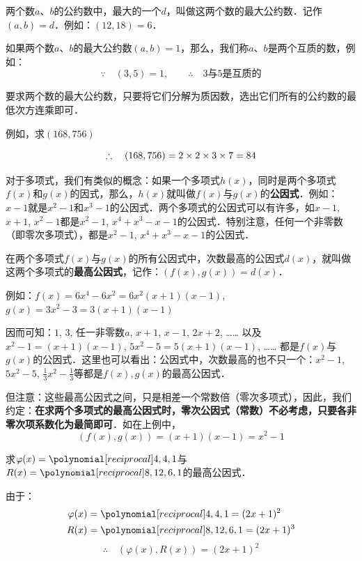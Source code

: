 两个数$a$、$b$的公约数中，最大的一个$d$，叫做这两个数的最大公约数．记作$(a,b)=d$．例如：$(12, 18)=6$．

如果两个数$a$、$b$的最大公约数$(a,b)=1$，那么，我们称$a$、$b$是两个互质的数，例如：
\[\because\quad (3,5)=1,\qquad \therefore\quad \text{3与5是互质的}\]

要求两个数的最大公约数，只要将它们分解为质因数，选出它们所有的公约数的最低次方连乘即可．

例如，求$(168,756)$
\begin{center}
\end{center}
\[\therefore \quad (168, 756)=2\times 2\times 3\times 7=84\]

对于多项式，我们有类似的概念：如果一个多项式$h(x)$，同时是两个多项式$f(x)$和$g(x)$的因式，那么，$h(x)$就叫做$f(x)$与$g(x)$的\textbf{公因式}．例如：$x-1$就是$x^2-1$和$x^3-1$的公因式．两个多项式的公因式可以有许多，如$x-1$, $x+1$, $x^2-1$都是$x^2-1$, $x^4+x^3-x-1$的公因式．特别注意，任何一个非零数（即零次多项式），都是$x^2-1$, $x^4+x^3-x-1$的公因式．

在两个多项式$f(x)$与$g(x)$的所有公因式中，次数最高的公因式$d(x)$，就叫做这两个多项式的\textbf{最高公因式}，记作：$(f(x),g(x))=d(x)$．

例如：$f(x)=6x^4-6x^2=6x^2(x+1)(x-1)$, 
$g (x) =3x^2-3=3 (x+1) (x-1)$

因而可知：$1$, $3$, 任一非零数$a$, $x+1$, $x-1$, $2x+2$, …… 以及$x^2-1=(x+1)(x-1)$, $5x^2-5=5(x+1)(x-1)$, …… 都是$f(x)$与$g(x)$的公因式．这里也可以看出：公因式中，次数最高的也不只一个：$x^2-1$,$5x^2-5$, $\frac{1}{3}x^2-\frac{1}{3}$等都是$f(x),g(x)$的最高公因式．

但注意：这些最高公因式之间，只是相差一个常数倍（零次多项式），因此，我们约定：\textbf{在求两个多项式的最高公因式时，零次公因式（常数）不必考虑，只要各非零次项系数化为最简即可}．如在上例中，
\[(f(x),g(x))=(x+1)(x-1)=x^2-1\]
\begin{example}
求$\varphi(x)=\poly{4,4,1}$与$R(x)=\poly{8,12,6,1}$的最高公因式．
\end{example}

\begin{solution}
由于：\[\begin{split}
    \varphi(x)&=\poly{4,4,1}=(2x+1)^2\\
    R(x)&=\poly{8,12,6,1}=(2x+1)^3
\end{split}\]
\[\therefore\quad (\varphi(x), R(x))=(2x+1)^2\]
\end{solution}


